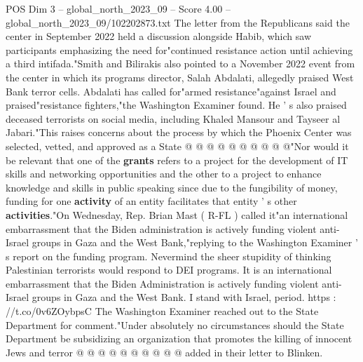 \begin{textsample}{POS Dim 3 – global\_north\_2023\_09 – Score 4.00 – global\_north\_2023\_09/102202873.txt}
The letter from the Republicans said the center in September 2022 held a discussion alongside Habib, which saw participants emphasizing the need for"continued resistance action until achieving a third intifada."Smith and Bilirakis also pointed to a November 2022 event from the center in which its programs director, Salah Abdalati, allegedly praised West Bank terror cells.
Abdalati has called for"armed resistance"against Israel and praised"resistance fighters,"the Washington Examiner found.
He ' s also praised deceased terrorists on social media, including Khaled Mansour and Tayseer al Jabari."This raises concerns about the process by which the Phoenix Center was selected, vetted, and approved as a State @ @ @ @ @ @ @ @ @ @"Nor would it be relevant that one of the \textbf{grants} refers to a project for the development of IT skills and networking opportunities and the other to a project to enhance knowledge and skills in public speaking since due to the fungibility of money, funding for one \textbf{activity} of an entity facilitates that entity ' s other \textbf{activities}."On Wednesday, Rep.
Brian Mast ( R-FL ) called it"an international embarrassment that the Biden administration is actively funding violent anti-Israel groups in Gaza and the West Bank,"replying to the Washington Examiner ' s report on the funding program.
Nevermind the sheer stupidity of thinking Palestinian terrorists would respond to DEI programs.
It is an international embarrassment that the Biden Administration is actively funding violent anti-Israel groups in Gaza and the West Bank.
I stand with Israel, period. https : //t.co/0v6ZOybpsC The Washington Examiner reached out to the State Department for comment."Under absolutely no circumstances should the State Department be subsidizing an organization that promotes the killing of innocent Jews and terror @ @ @ @ @ @ @ @ @ @ added in their letter to Blinken.

\end{textsample}
